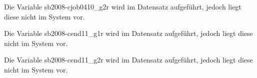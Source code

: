 \documentclass[a4paper]{article}
\begin{document}
				

		Die Variable sb2008-cjob0410\_g2r wird im Datensatz aufgeführt, jedoch liegt diese nicht im System vor.

				

				

				

				

				

				

		Die Variable sb2008-cend11\_g1r wird im Datensatz aufgeführt, jedoch liegt diese nicht im System vor.

				

		Die Variable sb2008-cend11\_g2r wird im Datensatz aufgeführt, jedoch liegt diese nicht im System vor.

				

				

				

				

				

				

				

				

				

				

				

				

				

				

				

				

				

				

				

				
\end{document}
